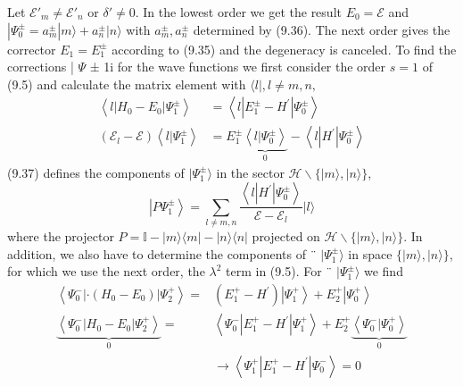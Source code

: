 Let $\mathcal{E}'_m\neq\mathcal{E}'_n$ or $\delta'\neq 0$. In the lowest order we get the result $E_0 = \mathcal{E}$ and $| \Psi_0^{\pm}=a_m^{\pm}|m\rangle+a_n^{\pm}|n\rangle$ with $a_m^{\pm},a_n^{\pm}$ determined by (9.36). The next order gives the corrector $E_1 = E_1^{\pm}$ according to (9.35) and the degeneracy is canceled. To find the corrections | $\Psi$ ± 1i for the wave functions we first consider the order $s = 1$ of (9.5) and calculate the matrix element with $\langle l |, l \neq m, n,$
\begin{equation}
\begin{aligned}\left\langle l\left|H_{0}-E_{0}\right| \Psi_{1}^{\pm}\right\rangle &=\left\langle l\left|E_{1}^{\pm}-H^{\prime}\right| \Psi_{0}^{\pm}\right\rangle \\\left(\mathcal{E}_{l}-\mathcal{E}\right)\left\langle l | \Psi_{1}^{\pm}\right\rangle &= E_{1}^{\pm} \underbrace{\left\langle l | \Psi_{0}^{\pm}\right\rangle}_{0}-\left\langle l\left|H^{\prime}\right| \Psi_{0}^{\pm}\right\rangle \end{aligned}
\end{equation}
(9.37) defines the components of $|\Psi_1^{\pm}\rangle$  in the sector $\mathcal{H} \backslash \{| m\rangle, | n\rangle\}$,
\begin{equation}
    \left|P \Psi_{1}^{\pm}\right\rangle=\sum_{l \neq m, n} \frac{\left\langle l\left|H^{\prime}\right| \Psi_{0}^{\pm}\right\rangle}{\mathcal{E}-\mathcal{E}_{l}}|l\rangle
    \end{equation}
where the projector $P=\mathbb{I}-|m\rangle\langle m|-| n\rangle\langle n|$ projected on $\mathcal{H} \backslash\{|m\rangle,|n\rangle\}$. In addition, we also have to determine the components of ¨ $|\Psi_1^{\pm}\rangle$ in space $\{|m\rangle,|n\rangle\}$, for which we use the next order, the $\lambda^2$ term in (9.5). For ¨ $|\Psi_1^{\pm}\rangle$ we find
\begin{equation}
\begin{aligned}
\left\langle\Psi_{0}^{-}\left|\cdot\left(H_{0}-E_{0}\right)\right| \Psi_{2}^{+}\right\rangle=&\left(E_{1}^{+}-H^{\prime}\right)\left|\Psi_{1}^{+}\right\rangle+ E_{2}^{+}\left|\Psi_{0}^{+}\right\rangle \\ 
\underbrace{\left\langle\Psi_{0}^{-}\left|H_{0}-E_{0}\right| \Psi_{2}^{+}\right\rangle}_{0}=&\left\langle\Psi_{0}^{-}\left|E_{1}^{+}-H^{\prime}\right| \Psi_{1}^{+}\right\rangle+ E_{2}^{+} \underbrace{\left\langle\Psi_{0}^{-} | \Psi_{0}^{+}\right\rangle}_{0} \\ 
& \rightarrow\left\langle\Psi_{1}^{+}\left|E_{1}^{+}-H^{\prime}\right| \Psi_{0}^{-}\right\rangle= 0 \end{aligned}
\end{equation}
